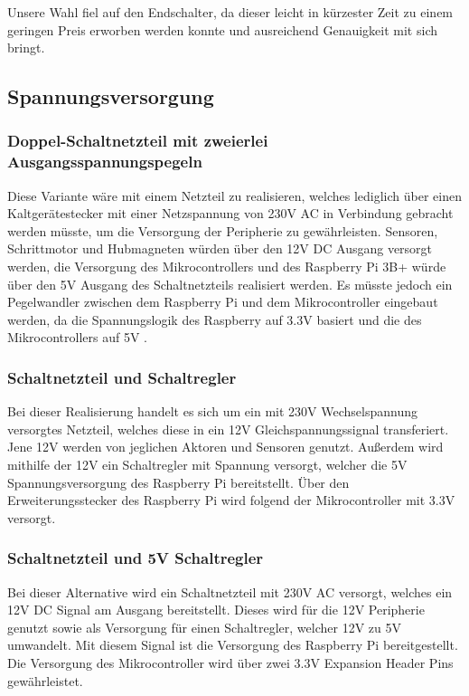 Unsere Wahl fiel auf den Endschalter, da dieser leicht in kürzester Zeit zu einem geringen Preis erworben werden konnte und ausreichend Genauigkeit mit sich bringt.

 \newpage
\subsection{Spannungsversorgung}
\subsubsection{Doppel-Schaltnetzteil mit zweierlei Ausgangsspannungspegeln}
Diese Variante wäre mit einem Netzteil zu realisieren, welches lediglich über einen Kaltgerätestecker mit einer Netzspannung von 230V \acs{AC} in Verbindung gebracht werden müsste,
um die Versorgung der Peripherie zu gewährleisten.
Sensoren, Schrittmotor und Hubmagneten würden über den 12V \acs{DC} Ausgang versorgt werden,
die Versorgung des Mikrocontrollers und des Raspberry Pi 3B+ würde über den 5V Ausgang des Schaltnetzteils realisiert werden.
Es müsste jedoch ein Pegelwandler zwischen dem Raspberry Pi und dem Mikrocontroller eingebaut werden, da die Spannungslogik des Raspberry auf 3.3V basiert und die des Mikrocontrollers auf 5V .

\subsubsection{Schaltnetzteil und Schaltregler}
Bei dieser Realisierung handelt es sich um ein mit 230V Wechselspannung versorgtes Netzteil, welches diese in ein 12V Gleichspannungssignal transferiert.
Jene 12V werden von jeglichen Aktoren und Sensoren genutzt.
Außerdem wird mithilfe der 12V ein Schaltregler mit Spannung versorgt, welcher die 5V Spannungsversorgung des Raspberry Pi bereitstellt.
Über den Erweiterungsstecker des Raspberry Pi wird folgend der Mikrocontroller mit 3.3V versorgt.

\subsubsection{Schaltnetzteil und 5V Schaltregler}
Bei dieser Alternative wird ein Schaltnetzteil mit 230V AC versorgt, welches ein 12V DC Signal am Ausgang bereitstellt.
Dieses wird für die 12V Peripherie genutzt sowie als Versorgung für einen Schaltregler, welcher 12V zu 5V umwandelt.
Mit diesem Signal ist die Versorgung des Raspberry Pi bereitgestellt.
Die Versorgung des Mikrocontroller wird über zwei 3.3V Expansion Header Pins gewährleistet.


